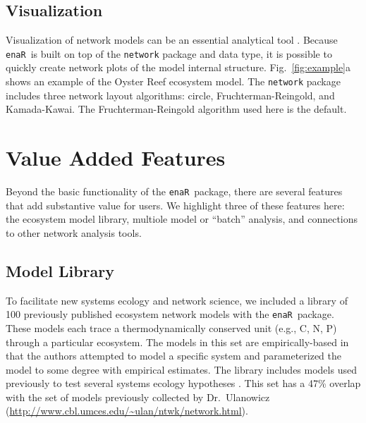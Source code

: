 \documentclass[11pt]{article}
\newcommand{\enaR}{\texttt{enaR}}
\begin{document}
\begin{spacing}{2}
\subsection{Visualization}
Visualization of network models can be an essential analytical tool
\citep{moody05dynamic,lima2011visual}.  Because \enaR\ is built on top
of the \texttt{network} package and data type, it is possible to
quickly create network plots of the model internal structure.
Fig.~\ref{fig:example}a shows an example of the Oyster Reef ecosystem
model.  The \texttt{network} package includes three network layout
algorithms: circle, Fruchterman-Reingold, and Kamada-Kawai.  The
Fruchterman-Reingold algorithm used here is the default.

\section{Value Added Features}
Beyond the basic functionality of the \enaR\ package, there are
several features that add substantive value for users.  We highlight
three of these features here: the ecosystem model library, multiole
model or ``batch'' analysis, and connections to other network analysis
tools.

\subsection{Model Library}
To facilitate new systems ecology and network science, we included a
library of 100 previously published ecosystem network models with the
\enaR\ package. These models each trace a thermodynamically conserved
unit (e.g., C, N, P) through a particular ecosystem.  The models in
this set are empirically-based in that the authors attempted to model
a specific system and parameterized the model to some degree with
empirical estimates.  The library includes models used previously to
test several systems ecology hypotheses \citep{borrett10_idd,
  borrett10_hmg, salas11_did, borrett13}.  This set has a 47\%
overlap with the set of models previously collected by Dr.\ Ulanowicz
(\url{http://www.cbl.umces.edu/~ulan/ntwk/network.html}).


\end{spacing}
\end{document}
